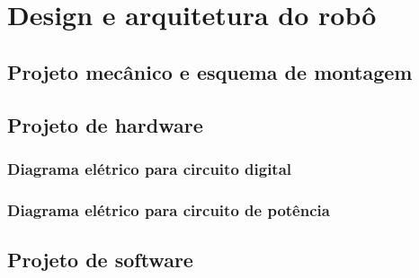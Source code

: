 
    \chapter{Design e arquitetura do robô}\label{cap: Design e arquitetura do robô}

    \section{\textbf{Projeto mecânico e esquema de montagem}}


    \section{\textbf{Projeto de hardware}}

    \subsection{Diagrama elétrico para circuito digital}

    \subsection{Diagrama elétrico para circuito de potência}

    \section{\textbf{Projeto de software}}

